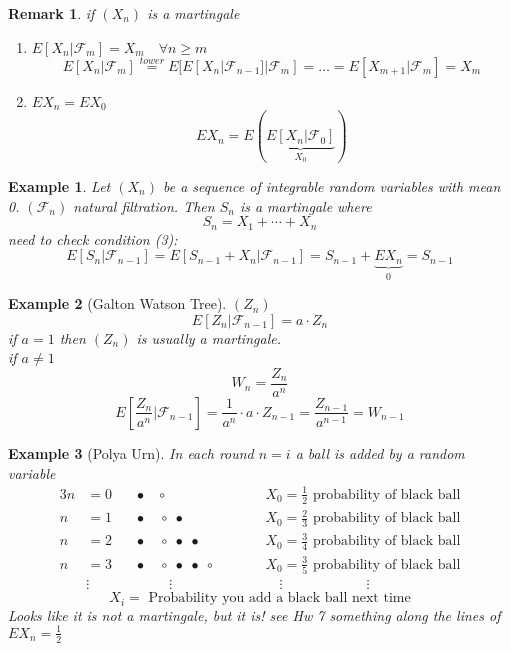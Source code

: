 \documentclass[12pt]{article}
\def\FF{\mathbb{F}}
\def\FF{\mathcal{F}}
\newtheorem{example}{Example}[section]
\newtheorem*{remark}{Remark}
\begin{document}
\begin{remark}
if $(X_n)$ is a martingale 
\begin{enumerate}[(1)]
\item $E[X_n | \FF_m] = X_m \quad \forall n \geq m$
\[E[X_n | \FF_m] \overset{tower}{=} E[E[X_{n} | \FF_{n-1}]|\FF_m] = \dots = E[X_{m+1} | \FF_m]=X_m\]
\item $EX_n = EX_0$
\[EX_n = E(\underbrace{E[X_n | \FF_0]}_{X_0})\]
\end{enumerate}
\end{remark}

\begin{example}
Let $(X_n)$ be a sequence of integrable random variables with mean 0. $(\FF_n)$ natural filtration. 
Then $S_n$ is a martingale where 
\[ S_n = X_1 + \cdots + X_n \]
need to check condition (3):
\[E[S_n | \FF_{n-1}] = E[S_{n-1} + X_n | \FF_{n-1}] = S_{n -1} + \underbrace{EX_n}_{0} = S_{n-1}\]
\end{example}

\begin{example}[Galton Watson Tree]
$(Z_n)$
\[E[Z_n | \FF_{n-1}] = a \cdot Z_n \]
if $a=1$ then $(Z_n)$ is usually a martingale. \\
if $a \neq 1$ 
\[W_n = \frac{Z_n}{a^n}\]
\[E\left[\frac{Z_n}{a^n} | \FF_{n-1}\right] = \frac{1}{a^n}\cdot a \cdot Z_{n-1} =  \frac{Z_{n-1}}{a^{n-1}} = W_{n-1} \]
\end{example}

\begin{example}[Polya Urn]
In each round $n=i$ a ball is added by a random variable 
\begin{alignat*}{3}
n&=0 &\quad  \bullet & \; \circ & \qquad &X_0 =\tfrac{1}{2} \text{ probability of black ball} \\ 
n&=1 &\quad  \bullet &\; \circ \; \bullet & \qquad &X_0 =\tfrac{2}{3} \text{ probability of black ball} \\
n&=2 &\quad  \bullet &\; \circ \; \bullet \; \bullet & \qquad &X_0 =\tfrac{3}{4} \text{ probability of black ball} \\
n&=3 &\quad  \bullet & \; \circ\; \bullet \; \bullet \; \circ & \qquad &X_0 =\tfrac{3}{5} \text{ probability of black ball} \\
&\vdots \; \; \; & \quad & \quad \vdots \qquad & \qquad & \quad \vdots \qquad \qquad \qquad  \vdots
\end{alignat*}
\[X_i = \text{ Probability you add a black ball next time}\]
Looks like it is not a martingale, but it is!
see Hw 7 something along the lines of $EX_n = \tfrac{1}{2}$
\end{example}
\end{document}
